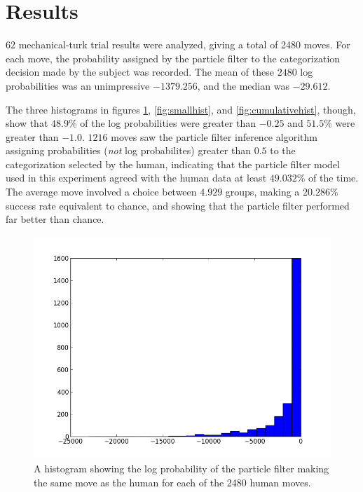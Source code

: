 \section{Results}
\label{sec:results}

62 mechanical-turk trial results were analyzed, giving a total of 2480 moves.
For each move, the probability assigned by the particle filter to the
categorization decision made by the subject was recorded. The mean of these
$2480$ log probabilities was an unimpressive $-1379.256$, and the median was
$-29.612$.

The three histograms in figures \ref{fig:fullhist}, \ref{fig:smallhist}, and
\ref{fig:cumulativehist}, though, show that $48.9\%$ of the
log probabilities were greater than $-0.25$ and $51.5\%$ were greater than
$-1.0$. $1216$ moves saw the particle filter inference algorithm assigning
probabilities (\emph{not} log probabilites) greater than $0.5$ to the categorization selected by the human,
indicating that the particle filter model used in this experiment agreed with
the human data at least $49.032\%$ of the time. The average move involved a
choice between $4.929$ groups, making a $20.286\%$ success rate equivalent to
chance, and showing that the particle filter performed far better than chance.

\begin{figure}
\centering
\includegraphics[scale=0.75]{img/hist0.png}
\caption{A histogram showing the log probability of the particle filter making
the same move as the human for each of the 2480 human moves.}
\label{fig:fullhist}
\end{figure}

